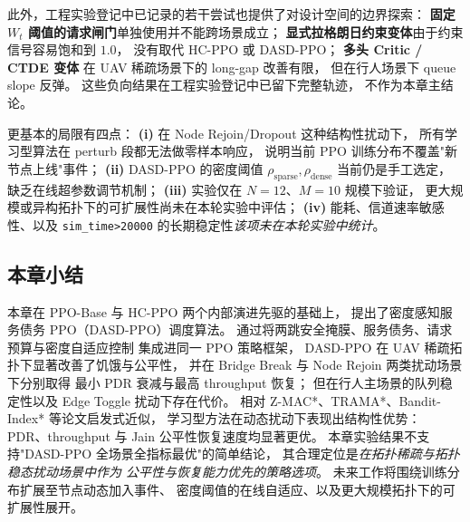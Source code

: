 \sloppy
此外，工程实验登记中已记录的若干尝试也提供了对设计空间的边界探索：
\textbf{固定 $W_t$ 阈值的请求闸门}单独使用并不能跨场景成立；
\textbf{显式拉格朗日约束变体}由于约束信号容易饱和到 $1.0$，
没有取代 HC-PPO 或 DASD-PPO；
\textbf{多头 Critic / CTDE 变体}
在 UAV 稀疏场景下的 long-gap 改善有限，
但在行人场景下 queue slope 反弹。
这些负向结果在工程实验登记中已留下完整轨迹，
不作为本章主结论。
\fussy

更基本的局限有四点：
\textbf{(i)} 在 Node Rejoin/Dropout 这种结构性扰动下，
所有学习型算法在 perturb 段都无法做零样本响应，
说明当前 PPO 训练分布不覆盖"新节点上线"事件；
\textbf{(ii)} DASD-PPO 的密度阈值 $\rho_{\mathrm{sparse}}, \rho_{\mathrm{dense}}$
当前仍是手工选定，缺乏在线超参数调节机制；
\textbf{(iii)} 实验仅在 $N=12$、$M=10$ 规模下验证，
更大规模或异构拓扑下的可扩展性尚未在本轮实验中评估；
\textbf{(iv)} 能耗、信道速率敏感性、以及 \texttt{sim\_time>20000}
的长期稳定性\emph{该项未在本轮实验中统计}。

\subsection{本章小结}
\label{subsec:summary}

本章在 PPO-Base 与 HC-PPO 两个内部演进先驱的基础上，
提出了密度感知服务债务 PPO（DASD-PPO）调度算法。
通过将两跳安全掩膜、服务债务、请求预算与密度自适应控制
集成进同一 PPO 策略框架，
DASD-PPO 在 UAV 稀疏拓扑下显著改善了饥饿与公平性，
并在 Bridge Break 与 Node Rejoin 两类扰动场景下分别取得
最小 PDR 衰减与最高 throughput 恢复；
但在行人主场景的队列稳定性以及 Edge Toggle 扰动下存在代价。
相对 Z-MAC*、TRAMA*、Bandit-Index* 等论文启发式近似，
学习型方法在动态扰动下表现出结构性优势：
PDR、throughput 与 Jain 公平性恢复速度均显著更优。
本章实验结果不支持"DASD-PPO 全场景全指标最优"的简单结论，
其合理定位是\emph{在拓扑稀疏与拓扑稳态扰动场景中作为
公平性与恢复能力优先的策略选项}。
未来工作将围绕训练分布扩展至节点动态加入事件、
密度阈值的在线自适应、以及更大规模拓扑下的可扩展性展开。
